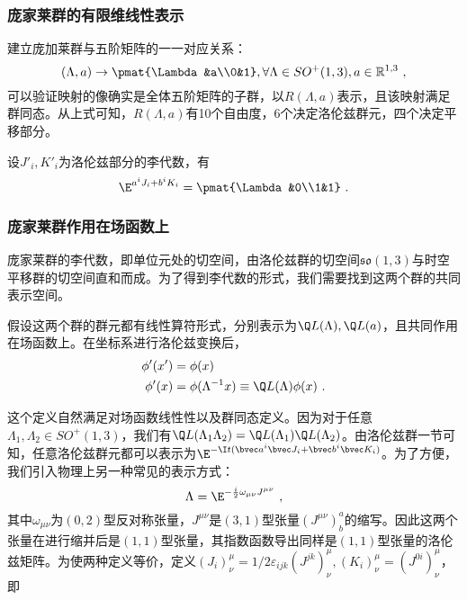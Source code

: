 \subsubsection{庞家莱群的有限维线性表示}

建立庞加莱群与五阶矩阵的一一对应关系：
\begin{equation}
(\Lambda,a)\rightarrow \pmat{\Lambda&a\\0&1},\forall \Lambda\in SO^+(1,3),a\in \mathbb R^{1,3}~,
\end{equation}
可以验证映射的像确实是全体五阶矩阵的子群，以$R(\Lambda,a)$表示，且该映射满足群同态。从上式可知，$R(\Lambda,a)$有10个自由度，6个决定洛伦兹群元，四个决定平移部分。

设$J'_i,K'_i$为洛伦兹部分的李代数，有
\begin{equation}
\E^{a^iJ_i+b^iK_i}=\pmat{\Lambda&0\\1&1}~.
\end{equation}




\subsubsection{庞家莱群作用在场函数上}
庞家莱群的李代数，即单位元处的切空间，由洛伦兹群的切空间$\mathfrak {so}(1,3)$与时空平移群的切空间直和而成。为了得到李代数的形式，我们需要找到这两个群的共同表示空间。

假设这两个群的群元都有线性算符形式，分别表示为$\Q L(\Lambda),\Q L(a)$，且共同作用在场函数上。在坐标系进行洛伦兹变换后，
\begin{equation}\label{eq_PoinGr_1}
\begin{aligned}
\phi'(x')&=\phi(x)\\
\phi'(x)&=\phi(\Lambda^{-1}x)\equiv \Q L(\Lambda)\phi(x)~.
\end{aligned}
\end{equation}

这个定义自然满足对场函数线性性以及群同态定义。因为对于任意$\Lambda_1,\Lambda_2\in SO^+(1,3)$，我们有$\Q L(\Lambda_1\Lambda_2)=\Q L(\Lambda_1)\Q L(\Lambda_2)$。由洛伦兹群一节可知，任意洛伦兹群元都可以表示为$\E^{-\I t(\bvec a^i\bvec J_i+\bvec b^i\bvec K_i)}$。为了方便，我们引入物理上另一种常见的表示方式：
\begin{equation}
\Lambda=\E^{-\frac{i}{2} \omega_{\mu \nu} J^{\mu \nu}}
~,
\end{equation}
其中$\omega_{\mu\nu}$为$(0,2)$型反对称张量，$J^{\mu\nu}$是$(3,1)$型张量$(J^{\mu\nu})^a_b$的缩写。因此这两个张量在进行缩并后是$(1,1)$型张量，其指数函数导出同样是$(1,1)$型张量的洛伦兹矩阵。为使两种定义等价，定义$(J_i)^{\mu}_{\nu}=1/2\varepsilon_{ijk}(J^{jk})^{\mu}_{\nu},(K_i)^{\mu}_{\nu}=(J^{0i})^{\mu}_{\nu}$，即

